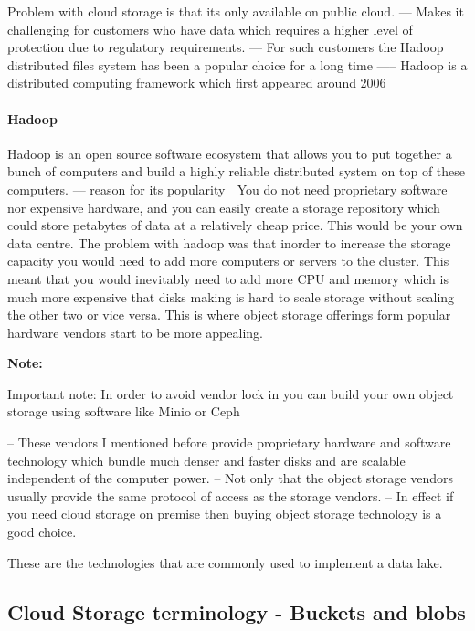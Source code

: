 \documentclass[a4paper, 11pt]{article}
\newenvironment{note}{
    \begin{siderule}
        \textbf{Note: }
        }{
    \end{siderule}}
\begin{document}
    Problem with cloud storage is that its only available on public cloud.
    --- Makes it challenging for customers who have data which requires a higher level of protection due to regulatory requirements.
    --- For such customers the Hadoop distributed files system has been a popular choice for a long time
    ----- Hadoop is a distributed computing framework which first appeared around 2006

    \paragraph{Hadoop}
    Hadoop is an open source software ecosystem that allows you to put together a bunch of computers and build a highly reliable distributed system on top of these computers.
    --- reason for its popularity ^^^
    You do not need proprietary software nor expensive hardware, and you can easily create a storage repository which could store petabytes of data at a relatively cheap price.
    This would be your own data centre.
    The problem with hadoop was that inorder to increase the storage capacity you would need to add more computers or servers to the cluster.
    This meant that you would inevitably need to add more CPU and memory which is much more expensive that disks making is hard to scale storage without scaling the other two or vice versa.
    This is where object storage offerings form popular hardware vendors start to be more appealing.
    \begin{note}
        Important note: In order to avoid vendor lock in you can build your own object storage using software like Minio or Ceph
    \end{note}

    -- These vendors I mentioned before provide proprietary hardware and software technology which bundle much denser and faster disks and are scalable independent of the computer power.
    -- Not only that the object storage vendors usually provide the same protocol of access as the storage vendors.
    -- In effect if you need cloud storage on premise then buying object storage technology is a good choice.

    These are the technologies that are commonly used to implement a data lake.

    \subsection{Cloud Storage terminology - Buckets and blobs}
\end{document}
